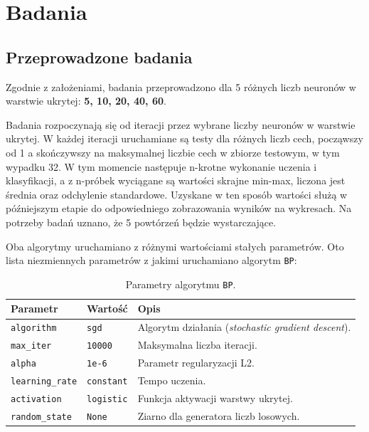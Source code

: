 \chapter{Badania}

\section{Przeprowadzone badania}

Zgodnie z założeniami, badania przeprowadzono dla 5 różnych liczb neuronów w warstwie ukrytej: \textbf{5, 10, 20, 40, 60}.

Badania rozpoczynają się od iteracji przez wybrane liczby neuronów w warstwie ukrytej. W każdej iteracji uruchamiane są testy dla różnych liczb cech, począwszy od 1 a skończywszy na maksymalnej liczbie cech w zbiorze testowym, w tym wypadku 32. W tym momencie następuje n-krotne wykonanie uczenia i klasyfikacji, a z n-próbek wyciągane są wartości skrajne min-max, liczona jest średnia oraz odchylenie standardowe. Uzyskane w ten sposób wartości służą w późniejszym etapie do odpowiedniego zobrazowania wyników na wykresach. Na potrzeby badań uznano, że 5 powtórzeń będzie wystarczające.

Oba algorytmy uruchamiano z różnymi wartościami stałych parametrów. Oto lista niezmiennych parametrów z jakimi uruchamiano algorytm \texttt{BP}:

\begin{table}[h!]
    \centering
    \caption{Parametry algorytmu \texttt{BP}.}
    \begin{tabular}{p{3cm}p{2cm}p{11cm}}
        \toprule
        \textbf{Parametr} & \textbf{Wartość} & \textbf{Opis} \\
        \midrule
        \texttt{algorithm} & \texttt{sgd} & Algorytm działania (\textit{stochastic gradient descent}). \\
        \texttt{max\_iter} & \texttt{10000} & Maksymalna liczba iteracji. \\
        \texttt{alpha} & \texttt{1e-6} & Parametr regularyzacji L2. \\
        \texttt{learning\_rate} & \texttt{constant} & Tempo uczenia. \\
        \texttt{activation} & \texttt{logistic} & Funkcja aktywacji warstwy ukrytej. \\
        \texttt{random\_state} & \texttt{None} & Ziarno dla generatora liczb losowych. \\
        \bottomrule
    \end{tabular}
\end{table}

